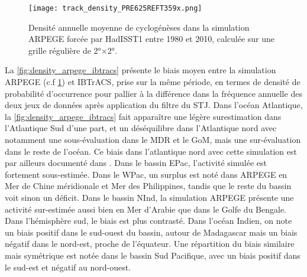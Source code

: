 \documentclass[../main.tex]{subfiles}
\begin{document}
\begin{figure}[tb]
    \centering
    \texttt{[image: track\_density\_PRE625REFT359x.png]}
    \caption{Densité annuelle moyenne de cyclogénèses dans la simulation ARPEGE forcée par HadISST1 entre 1980 et 2010, calculée sur une grille régulière de
    \ang{2}$\times$\ang{2}.}
    \label{fig:track_density_PRE625REFT359x}
\end{figure}

La \cref{fig:density_arpege_ibtracs} présente le biais moyen entre la simulation ARPEGE (c.f \cref{fig:track_density_PRE625REFT359x}) et IBTrACS, prise sur la
même période, en termes de densité de probabilité d'occurrence pour pallier à la différence dans la fréquence annuelle des deux jeux de données après
application du filtre du STJ. Dans l'océan Atlantique, la \cref{fig:density_arpege_ibtracs} fait apparaître une légère surestimation dans l'Atlantique Sud d'une
part, et un déséquilibre dans l'Atlantique nord avec notamment une sous-évaluation dans le MDR et le GoM, mais une sur-évaluation dans le reste de l'océan. Ce
biais dans l'atlantique nord avec cette simulation est par ailleurs documenté dans \textcite{chauvin_future_2020}. Dans le bassin EPac, l'activité simulée est
fortement sous-estimée. Dans le WPac, un surplus est noté dans ARPEGE en Mer de Chine méridionale et Mer des Philippines, tandis que le reste du bassin voit
sinon un déficit. Dans le bassin NInd, la simulation ARPEGE présente une activité sur-estimée aussi bien en Mer d'Arabie que dans le Golfe du Bengale. Dans
l'hémisphère sud, le biais est plus contrasté. Dans l'océan Indien, on note un biais positif dans le sud-ouest du bassin, autour de Madagascar mais un biais
négatif dans le nord-est, proche de l'équateur. Une répartition du biais similaire mais symétrique est notée dans le bassin Sud Pacifique, avec un biais positif
dans le sud-est et négatif au nord-ouest.
\end{document}
